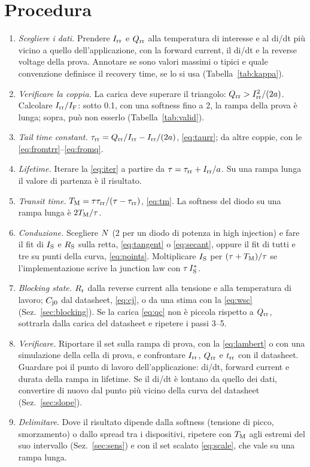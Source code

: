 \documentclass[10pt,a4paper]{scrartcl}
\let\newcommand\pdvaluedefine
\newcommand{\IF}{I_\mathrm{F}}
\newcommand{\Irr}{I_\mathrm{rr}}
\newcommand{\Qrr}{Q_\mathrm{rr}}
\newcommand{\trr}{t_\mathrm{rr}}
\newcommand{\taurr}{\tau_\mathrm{rr}}
\newcommand{\TM}{T_\mathrm{M}}
\newcommand{\IS}{I_\mathrm{S}}
\newcommand{\RS}{R_\mathrm{S}}
\newcommand{\Rr}{R_\mathrm{r}}
\newcommand{\Cjo}{C_\mathrm{j0}}
\newcommand{\Nem}{N}                          %
\begin{document}
\section{Procedura}
\label{sec:procedure}
\begin{enumerate}
\item \emph{Scegliere i dati.} Prendere $\Irr$ e $\Qrr$ alla temperatura di interesse e al di/dt più vicino a quello dell'applicazione, con la forward current, il di/dt e la reverse voltage della prova. Annotare se sono valori massimi o tipici e quale convenzione definisce il recovery time, se lo si usa (Tabella~\ref{tab:kappa}).
\item \emph{Verificare la coppia.} La carica deve superare il triangolo: $\Qrr > \Irr^2/(2a)$. Calcolare $\Irr/\IF$: sotto \num{0.1}, con una softness fino a 2, la rampa della prova è lunga; sopra, può non esserlo (Tabella~\ref{tab:valid}).
\item \emph{Tail time constant.} $\taurr = \Qrr/\Irr - \Irr/(2a)$, \eqref{eq:taurr}; da altre coppie, con le \eqref{eq:fromtrr}--\eqref{eq:fromq}.
\item \emph{Lifetime.} Iterare la \eqref{eq:iter} a partire da $\tau = \taurr + \Irr/a$. Su una rampa lunga il valore di partenza è il risultato.
\item \emph{Transit time.} $\TM = \tau\taurr/(\tau-\taurr)$, \eqref{eq:tm}. La softness del diodo su una rampa lunga è $2\TM/\tau$.
\item \emph{Conduzione.} Scegliere $\Nem$ (2 per un diodo di potenza in high injection) e fare il fit di $\IS$ e $\RS$ sulla retta, \eqref{eq:tangent} o \eqref{eq:secant}, oppure il fit di tutti e tre su punti della curva, \eqref{eq:points}. Moltiplicare $\IS$ per $(\tau+\TM)/\tau$ se l'implementazione scrive la junction law con $\tau\,\IS^{*}$.
\item \emph{Blocking state.} $\Rr$ dalla reverse current alla tensione e alla temperatura di lavoro; $\Cjo$ dal datasheet, \eqref{eq:cj}, o da una stima con la \eqref{eq:wsc} (Sez.~\ref{sec:blocking}). Se la carica \eqref{eq:qc} non è piccola rispetto a $\Qrr$, sottrarla dalla carica del datasheet e ripetere i passi 3--5.
\item \emph{Verificare.} Riportare il set sulla rampa di prova, con la \eqref{eq:lambert} o con una simulazione della cella di prova, e confrontare $\Irr$, $\Qrr$ e $\trr$ con il datasheet. Guardare poi il punto di lavoro dell'applicazione: di/dt, forward current e durata della rampa in lifetime. Se il di/dt è lontano da quello dei dati, convertire di nuovo dal punto più vicino della curva del datasheet (Sez.~\ref{sec:slope}).
\item \emph{Delimitare.} Dove il risultato dipende dalla softness (tensione di picco, smorzamento) o dallo spread tra i dispositivi, ripetere con $\TM$ agli estremi del suo intervallo (Sez.~\ref{sec:sens}) e con il set scalato \eqref{eq:scale}, che vale su una rampa lunga.
\end{enumerate}
\end{document}
